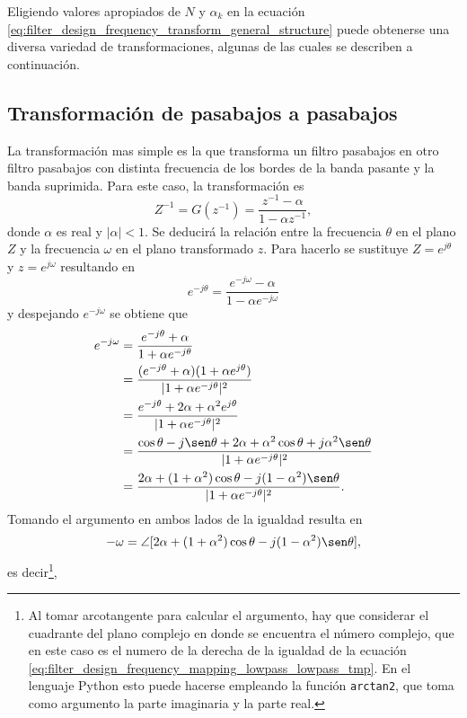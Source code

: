 \documentclass[a4paper]{report}
\begin{document}
Eligiendo valores apropiados de \(N\) y \(\alpha_k\) en la ecuación \ref{eq:filter_design_frequency_transform_general_structure} puede obtenerse una diversa variedad de transformaciones, algunas de las cuales se describen a continuación. 

\subsection{Transformación de pasabajos a pasabajos}

La transformación mas simple es la que transforma un filtro pasabajos en otro filtro pasabajos con distinta frecuencia de los bordes de la banda pasante y la banda suprimida. Para este caso, la transformación es
\begin{equation}\label{eq:filter_design_frequency_transform_lowpass_lowpass}
 Z^{-1}=G(z^{-1})=\frac{z^{-1}-\alpha}{1-\alpha z^{-1}}, 
\end{equation}
donde \(\alpha\) es real y \(|\alpha|<1\). Se deducirá la relación entre la frecuencia \(\theta\) en el plano \(Z\) y la frecuencia \(\omega\) en el plano transformado \(z\). Para hacerlo se sustituye \(Z=e^{j\theta}\) y \(z=e^{j\omega}\) resultando en 
\begin{equation}\label{eq:filter_design_frequency_transform_unit_circle_lowpass_lowpass}
 e^{-j\theta}=\frac{e^{-j\omega}-\alpha}{1-\alpha e^{-j\omega}} 
\end{equation}
y despejando \(e^{-j\omega}\) se obtiene que 
\begin{align*}
 e^{-j\omega}&=\frac{e^{-j\theta}+\alpha}{1+\alpha e^{-j\theta}}\\
  &=\frac{(e^{-j\theta}+\alpha)(1+\alpha e^{j\theta})}{|1+\alpha e^{-j\theta}|^2}\\
  &=\frac{e^{-j\theta}+2\alpha+\alpha^2e^{j\theta}}{|1+\alpha e^{-j\theta}|^2}\\
  &=\frac{\cos\theta-j\sen\theta+2\alpha+\alpha^2\cos\theta+j\alpha^2\sen\theta}{|1+\alpha e^{-j\theta}|^2}\\
  &=\frac{2\alpha+(1+\alpha^2)\cos\theta-j(1-\alpha^2)\sen\theta}{|1+\alpha e^{-j\theta}|^2}.
\end{align*}
Tomando el argumento en ambos lados de la igualdad resulta en
\begin{equation}\label{eq:filter_design_frequency_mapping_lowpass_lowpass_tmp}
 -\omega=\angle[2\alpha+(1+\alpha^2)\cos\theta-j(1-\alpha^2)\sen\theta], 
\end{equation}
es decir\footnote{Al tomar arcotangente para calcular el argumento, hay que considerar el cuadrante del plano complejo en donde se encuentra el número complejo, que en este caso es el numero de la derecha de la igualdad de la ecuación \ref{eq:filter_design_frequency_mapping_lowpass_lowpass_tmp}. En el lenguaje Python esto puede hacerse empleando la función \texttt{arctan2}, que toma como argumento la parte imaginaria y la parte real.},
\end{document}
